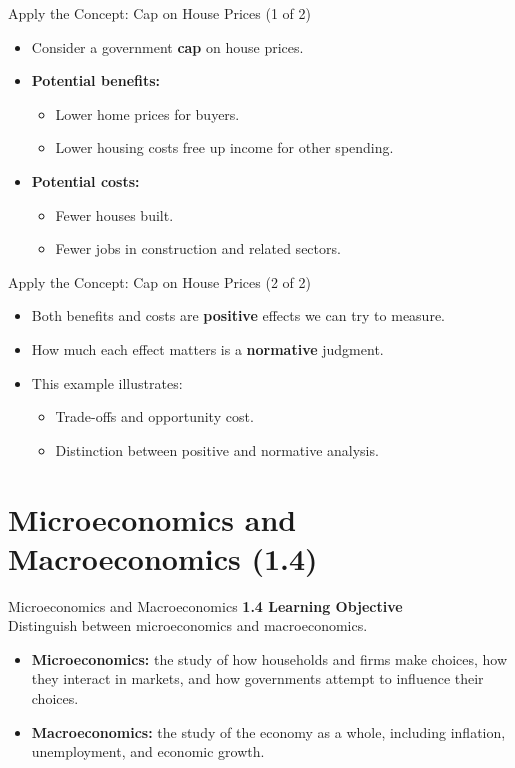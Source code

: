 \documentclass[aspectratio=169]{beamer}
\begin{document}
\begin{frame}{Apply the Concept: Cap on House Prices (1 of 2)}
\transfade
\begin{itemize}[<+->]
  \item Consider a government \textbf{cap} on house prices.
  \item \textbf{Potential benefits:}
  \begin{itemize}[<+->]
    \item Lower home prices for buyers.
    \item Lower housing costs free up income for other spending.
  \end{itemize}
  \item \textbf{Potential costs:}
  \begin{itemize}[<+->]
    \item Fewer houses built.
    \item Fewer jobs in construction and related sectors.
  \end{itemize}
\end{itemize}
\end{frame}

\begin{frame}{Apply the Concept: Cap on House Prices (2 of 2)}
\transfade
\begin{itemize}[<+->]
  \item Both benefits and costs are \textbf{positive} effects we can try to measure.
  \item How much each effect matters is a \textbf{normative} judgment.
  \item This example illustrates:
  \begin{itemize}[<+->]
    \item Trade-offs and opportunity cost.
    \item Distinction between positive and normative analysis.
  \end{itemize}
\end{itemize}
\end{frame}

\section{Microeconomics and Macroeconomics (1.4)}

\begin{frame}{Microeconomics and Macroeconomics}
\transfade
\textbf{1.4 Learning Objective}\\[0.3em]
Distinguish between microeconomics and macroeconomics.
\begin{itemize}[<+->]
  \item \textbf{Microeconomics:} the study of how households and firms make choices, how they interact in markets, and how governments attempt to influence their choices.
  \item \textbf{Macroeconomics:} the study of the economy as a whole, including inflation, unemployment, and economic growth.
\end{itemize}
\end{frame}
\end{document}
